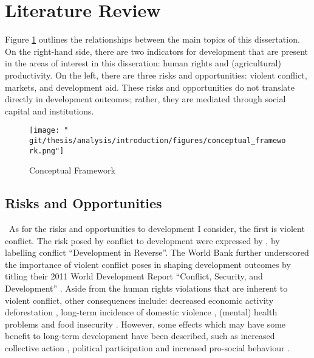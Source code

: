 \section{Literature Review}
Figure \ref{intro:fig:framework} outlines the relationships between the main topics of this dissertation. On the right-hand side, there are two indicators for development that are present in the areas of interest in this disseration: human rights and (agricultural) productivity. On the left, there are three risks and opportunities: violent conflict, markets, and development aid. These risks and opportunities do not translate directly in development outcomes; rather, they are mediated through social capital and institutions.

\begin{figure}[htb]
  \centering
  \texttt{[image: "\\git/thesis/analysis/introduction/figures/conceptual\_framework.png"]}
  \caption{Conceptual Framework}
  \label{intro:fig:framework}
\end{figure}

\subsection{Risks and Opportunities}\
As for the risks and opportunities to development I consider, the first is violent conflict. The risk posed by conflict to development were expressed by \citet{Collier2003}, by labelling conflict ``Development in Reverse''. The World Bank further underscored the importance of violent conflict poses in shaping development outcomes by titling their 2011 World Development Report ``Conflict, Security, and Development'' \citep{WorldBank2011}. Aside from the human rights violations that are inherent to violent conflict, other consequences include: decreased economic activity \citep{Collier1999} deforestation \cite[e.g.][]{Connectiona}, long-term incidence of domestic violence \citep[e.g.][]{LaMattina2017, Muller2019}, (mental) health problems \cite[e.g.][]{Smith2002, Iqbal2006a,Akresh2011} and food insecurity \cite[e.g.][]{Lecoutere2005, Verwimp2012}. However, some effects which may have some benefit to long-term development have been described, such as increased collective action \citep{Bellows2009b}, political participation \citep{Blattman2009a} and increased pro-social behaviour \citep{Voors2012a}.

